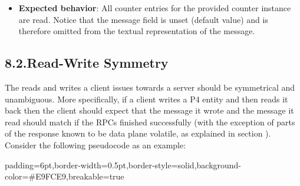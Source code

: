 \documentclass[11pt]{article}
\begin{document}
{\begin{enumerate}
\begin{itemize}[noitemsep,topsep=\mdcompacttopsep]
\item{}\textbf{Expected behavior}: All counter entries for the provided counter
instance are read. Notice that the  message field is unset (default
value) and is therefore omitted from the textual representation of the
message.%
\end{itemize}%
\end{enumerate}%

\subsection{8.2.\hspace*{0.5em}Read-Write Symmetry}\label{sec-read-write-symmetry}%

\noindent{}The reads and writes a client issues towards a server should be symmetrical and
unambiguous. More specifically, if a client writes a P4 entity and then reads it
back then the client should expect that the message it wrote and the message it
read should match if the RPCs finished successfully (with the exception of parts
of the response known to be data plane volatile, as explained in section
). Consider the following pseudocode as an
example:%

\begin{mdbmargintb}{6pt}{6pt}%
\begin{mdblock}{padding=6pt,border-width=0.5pt,border-style=solid,background-color=\#E9FCE9,breakable=true}%
\begin{mdpre}%
\end{mdpre}%
\end{mdblock}%
\end{mdbmargintb}%

}
\end{document}
